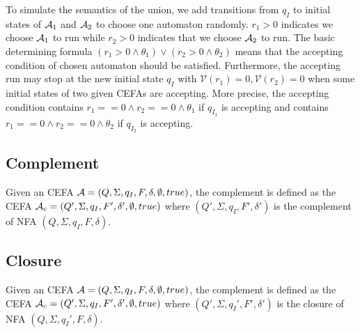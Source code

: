 To simulate the semantics of the union, we add transitions from $q_I$ to initial states of $\mathcal{A}_1$ and $\mathcal{A}_2$ to choose one automaton randomly. $r_1 > 0$ indicates we choose $\mathcal{A}_1$ to run while $r_2 > 0$ indicates that we choose $\mathcal{A}_2$ to run. The basic determining formula $(r_1>0\wedge\theta_1)\vee(r_2>0\wedge\theta_2)$ means that the accepting condition of chosen automaton should be satisfied. Furthermore, the accepting run may stop at the new initial state $q_I$ with $\mathcal{V}(r_1) = 0, \mathcal{V}(r_2)=0$ when some initial states of two given CEFAs are accepting. More precise, the accepting condition contains $r_1==0\wedge r_2==0\wedge\theta_1$ if $q_{I_1}$ is accepting and contains $r_1==0\wedge r_2==0\wedge\theta_2$ if $q_{I_2}$ is accepting.
\subsection{Complement} \label{subsec:complement}
Given an CEFA $\mathcal{A} = (Q, \Sigma, q_{I}, F, \delta, \emptyset, true)$, the complement is defined as the CEFA $\mathcal{A}_c = (Q', \Sigma, q_{I}, F', \delta', \emptyset, true)$ where $(Q', \Sigma, q_{I}, F', \delta')$ is the complement of NFA $(Q, \Sigma, q_{I}, F, \delta)$.
\subsection{Closure} \label{subsec:closure}
Given an CEFA $\mathcal{A} = (Q, \Sigma, q_{I}, F, \delta, \emptyset, true)$, the complement is defined as the CEFA $\mathcal{A}_c = (Q', \Sigma, q_{I}, F', \delta', \emptyset, true)$ where $(Q', \Sigma, q_{I}', F', \delta')$ is the closure of NFA $(Q, \Sigma, q_{I}', F, \delta)$.
